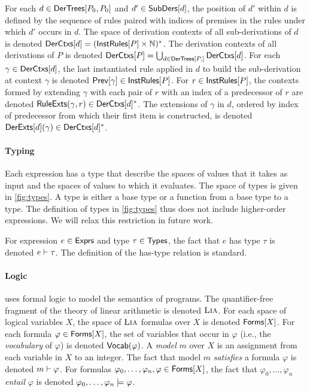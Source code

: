 For each $d \in \mathsf{DerTrees}[ P_0, P_0 ]$ and $d' \in \mathsf{SubDers}[ d ]$, the
position of $d'$ within $d$ is defined by the sequence of rules paired
with indices of premises in the rules under which $d'$ occurs in $d$.
%
The space of derivation contexts of all sub-derivations of $d$ is
denoted $\mathsf{DerCtxs}[ d ] = (\mathsf{InstRules}[ P ] \times \mathbb{N})^{*}$.
%
The derivation contexts of all derivations of $P$ is denoted
$\derctxs{P} = \bigunion_{ d \in \dertrees{P} } \derctxs{ d }$.
%
For each $\gamma \in \mathsf{DerCtxs}[ d ]$, the last instantiated rule applied
in $d$ to build the sub-derivation at context $\gamma$ is denoted
$\mathsf{Prev}[  \gamma  ] \in \mathsf{InstRules}[ P ]$.
%
For $r \in \mathsf{InstRules}[  P  ]$, the contexts formed by extending $\gamma$
with each pair of $r$ with an index of a predecessor of $r$ are
denoted $\mathsf{RuleExts}(\gamma, r) \in \mathsf{DerCtxs}[ d ]^{*}$.
%
The extensions of $\gamma$ in $d$, ordered by index of predecessor
from which their first item is constructed, is denoted $\mathsf{DerExts}[  d
 ](\gamma) \in \mathsf{DerCtxs}[  d  ]^{*}$.

\paragraph{Typing}
%
Each expression has a type that describe the spaces of values that it
takes as input and the spaces of values to which it evaluates.
%
The space of types is given in \autoref{fig:types}.
%
A type is either a base type or a function from a base type to a type.
%
The definition of types in \autoref{fig:types} thus does not include
higher-order expressions.
%
We will relax this restriction in future work.
%

For expression $e \in \mathsf{Exprs}$ and type $\tau \in \mathsf{Types}$, the fact that
$e$ has type $\tau$ is denoted $e \vdash \tau$.
%
The definition of the has-type relation is standard.

\paragraph{Logic}
%
\sys uses formal logic to model the semantics of programs.
%
The quantifier-free fragment of the theory of linear arithmetic is
denoted $\textsc{Lia}$.
%
For each space of logical variables $X$, the space of $\textsc{Lia}$ formulas
over $X$ is denoted $\mathsf{Forms}[ X ]$.
%
For each formula $\varphi \in \mathsf{Forms}[ X ]$, the set of variables that
occur in $\varphi$ (i.e., the \emph{vocabulary} of $\varphi$) is
denoted $\mathsf{Vocab}(\varphi)$.
A \lia \emph{model} $m$ over $X$ is an assignment from each variable
in $X$ to an integer.
%
The fact that model $m$ \emph{satisfies} a formula $\varphi$ is
denoted $m \vdash \varphi$.
%
For formulas $\varphi_0, \ldots, \varphi_n, \varphi \in \mathsf{Forms}[ X ]$,
the fact that $\varphi_0, \ldots, \varphi_n$ \emph{entail} $\varphi$
is denoted $\varphi_0, \ldots, \varphi_n \models \varphi$.

